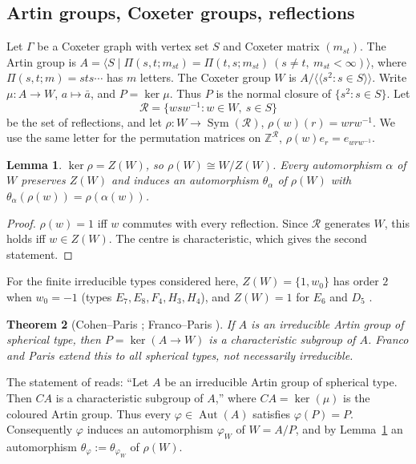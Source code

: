 \documentclass[11pt]{amsart}
\newtheorem{theorem}{Theorem}[section]
\newtheorem{lemma}[theorem]{Lemma}
\theoremstyle{definition}
\newcommand{\Z}{\mathbb{Z}}
\newcommand{\R}{\mathcal{R}}
\newcommand{\Aut}{\operatorname{Aut}}
\newcommand{\Sym}{\operatorname{Sym}}
\begin{document}
\subsection{Artin groups, Coxeter groups, reflections}
Let $\Gamma$ be a Coxeter graph with vertex set $S$ and Coxeter matrix $(m_{st})$. The Artin group is
$A=\langle S\mid \Pi(s,t;m_{st})=\Pi(t,s;m_{st})\ (s\neq t,\ m_{st}<\infty)\rangle$, where $\Pi(s,t;m)=sts\cdots$
has $m$ letters. The Coxeter group $W$ is $A/\langle\!\langle s^2:s\in S\rangle\!\rangle$. Write
$\mu\colon A\to W$, $a\mapsto\bar a$, and $P=\ker\mu$. Thus $P$ is the normal closure of $\{s^2:s\in S\}$. Let
\[\R=\{wsw^{-1}:w\in W,\ s\in S\}\]
be the set of reflections, and let $\rho\colon W\to\Sym(\R)$, $\rho(w)(r)=wrw^{-1}$. We use the same letter for
the permutation matrices on $\Z^\R$, $\rho(w)e_r=e_{wrw^{-1}}$.

\begin{lemma}\label{lem:rho}
$\ker\rho=Z(W)$, so $\rho(W)\cong W/Z(W)$. Every automorphism $\alpha$ of $W$ preserves $Z(W)$ and induces an
automorphism $\theta_\alpha$ of $\rho(W)$ with $\theta_\alpha(\rho(w))=\rho(\alpha(w))$.
\end{lemma}
\begin{proof}
$\rho(w)=1$ iff $w$ commutes with every reflection. Since $\R$ generates $W$, this holds iff $w\in Z(W)$. The
centre is characteristic, which gives the second statement.
\end{proof}

For the finite irreducible types considered here, $Z(W)=\{1,w_0\}$ has order $2$ when $w_0=-1$ (types
$E_7,E_8,F_4,H_3,H_4$), and $Z(W)=1$ for $E_6$ and $D_5$ \cite[\S3.19]{Hum90}.

\begin{theorem}[Cohen--Paris {\cite[Thm.~1.4]{CP03}}; Franco--Paris {\cite{FP06}}]\label{thm:char}
If $A$ is an irreducible Artin group of spherical type, then $P=\ker(A\to W)$ is a characteristic subgroup of $A$.
Franco and Paris \cite{FP06} extend this to all spherical types, not necessarily irreducible.
\end{theorem}

The statement of \cite[Thm.~1.4]{CP03} reads: ``Let $A$ be an irreducible Artin group of spherical type. Then
$CA$ is a characteristic subgroup of $A$,'' where $CA=\ker(\mu)$ is the coloured Artin group. Thus every
$\varphi\in\Aut(A)$ satisfies $\varphi(P)=P$. Consequently $\varphi$ induces an automorphism $\varphi_W$ of
$W=A/P$, and by Lemma~\ref{lem:rho} an automorphism $\theta_\varphi:=\theta_{\varphi_W}$ of $\rho(W)$.
\end{document}
